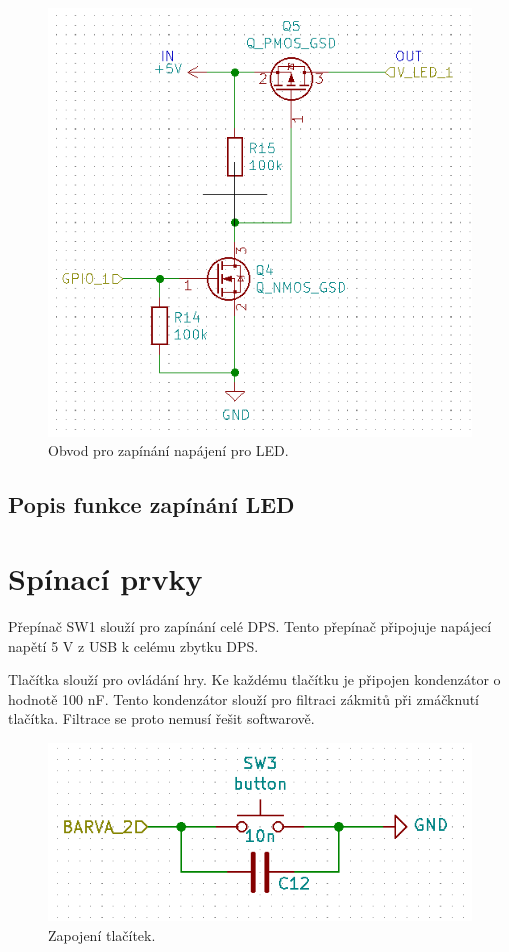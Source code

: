 \begin{figure}[!h]
  \begin{center}
    \includegraphics[scale=0.5]{obrazky/Zapinani_napajeni_LED.png}
  \end{center}
  \caption[Zapinani LED]{Obvod pro zapínání napájení pro LED.}
\end{figure}


\subsection{Popis funkce zapínání LED}

\section{Spínací prvky}
Přepínač SW1 slouží pro zapínání celé DPS. Tento přepínač připojuje napájecí napětí 5 V z USB k celému zbytku DPS.

Tlačítka slouží pro ovládání hry. Ke každému tlačítku je připojen kondenzátor o hodnotě 100 nF. Tento kondenzátor 
slouží pro filtraci zákmitů při zmáčknutí tlačítka. Filtrace se proto nemusí řešit softwarově.

\begin{figure}[!h]
  \begin{center}
    \includegraphics[scale=0.5]{obrazky/Tlacitka_zapojeni.png}
  \end{center}
  \caption[Zapojení tlačítek]{Zapojení tlačítek.}
\end{figure}

